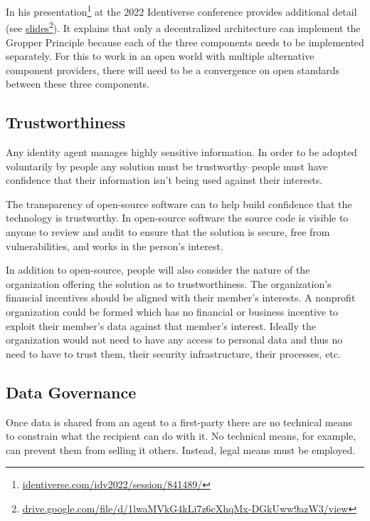 \documentclass[11pt, oneside]{article}   	%
\newcommand{\hyperfootnote}[1][]{\def\ArgI{{#1}}\hyperfootnoteRelay}
\newcommand\hyperfootnoteRelay[2][]{\href{#1#2}{\ArgI}\footnote{\href{#1#2}{#2}}}
\begin{document}
In his presentation\hyperfootnote[][https://]{identiverse.com/idv2022/session/841489/} at the 2022 Identiverse conference provides additional detail (see \hyperfootnote[slides][https://]{drive.google.com/file/d/1lwaMVkG4kLi7z6cXhqMx-DGkUww9azW3/view}). It explains that only a decentralized architecture can implement the Gropper Principle because each of the three components needs to be implemented separately. For this to work in an open world with multiple alternative component providers, there will need to be a convergence on open standards between these three components. 

\subsection{Trustworthiness}

Any identity agent manages highly sensitive information. In order to be adopted voluntarily by people any solution must be trustworthy--people must have confidence that their information isn't being used against their interests. 

The transparency of open-source software can to help build confidence that the technology is trustworthy. In open-source software the source code is visible to anyone to review and audit to ensure that the solution is secure, free from vulnerabilities, and works in the person's interest.

In addition to open-source, people will also consider the nature of the organization offering the solution as to trustworthiness. The organization's financial incentives should be aligned with their member's interests. A nonprofit organization could be formed which has no financial or business incentive to exploit their member's data against that member's interest. Ideally the organization would not need to have any access to personal data and thus no need to have to trust them, their security infrastructure, their processes, etc.

\subsection{Data Governance}

Once data is shared from an agent to a first-party there are no technical means to constrain what the recipient can do with it. No technical means, for example, can prevent them from selling it others. Instead, legal means must be employed. 
\end{document}

